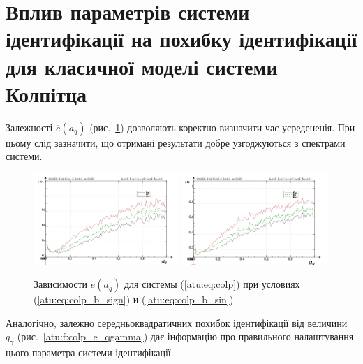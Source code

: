 
\section{Вплив параметрів системи ідентифікації на похибку ідентифікації для класичної моделі системи Колпітца} %

Залежності
$ \overline{e} (a_q) $ (рис.~\ref{atu:f:colp_e_a_q}) дозволяють коректно визначити час
усредененія. При цьому слід зазначити, що отримані результати
добре узгоджуються з спектрами системи.

\begin{figure}[htb!]
\centerline{
  \includegraphics[width=0.49\textwidth]{p/mod/colp_m5p-p_a_q_e_sign.png}
  \includegraphics[width=0.49\textwidth]{p/mod/colp_m5p-p_a_q_e_sin.png}
}
  \caption{Зависимости  $\overline{e}(a_q)$ для системы (\ref{atu:eq:colp})
  при условиях (\ref{atu:eq:colp_b_sign}) и (\ref{atu:eq:colp_b_sin})
}
\label{atu:f:colp_e_a_q}
\end{figure}

Аналогічно, залежно середньоквадратичних похибок ідентифікації
від величини
$ q_\gamma $ (рис.~\ref{atu:f:colp_e_qgamma}) дає інформацію про правильного
налаштування цього параметра системи ідентифікації.

